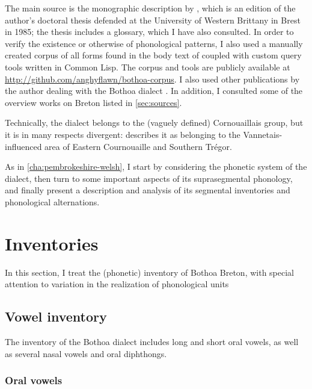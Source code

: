 The main source is the monographic description by \citet{humphreys95:_phonol_bothoa_saint_nicol_pelem}, which is an edition of the author's doctoral thesis defended at the University of Western Brittany in Brest in 1985;  the thesis includes a glossary, which I have also consulted. In order to verify the existence or otherwise of phonological patterns, I also used a manually created corpus of all forms found in the body text of \citet{humphreys95:_phonol_bothoa_saint_nicol_pelem} coupled with custom query tools written in Common Lisp. The corpus and tools are publicly available at \url{http://github.com/anghyflawn/bothoa-corpus}. I also used other publications by the author dealing with the Bothoa dialect \citep{humphreys,humphreys90:_tradit_moder_breton_welsh}. In addition, I consulted some of the overview works on Breton listed in \cref{sec:sources}.

Technically, the dialect belongs to the (vaguely defined) Cornouaillais group, but it is in many respects divergent: \citet{humphreys95:_phonol_bothoa_saint_nicol_pelem} describes it as belonging to the Vannetais-influenced area of Eastern Cournouaille and Southern Trégor.

As in \cref{cha:pembrokeshire-welsh}, I start by considering the phonetic system of the dialect, then turn to some important aspects of its suprasegmental phonology, and finally present a description and analysis of its segmental inventories and phonological alternations.

\section{Inventories}
\label{sec:inventories}

In this section, I treat the (phonetic) inventory of Bothoa Breton, with special attention to variation in the realization of phonological units

\subsection{Vowel inventory}
\label{sec:vowel-inventory}

The inventory of the Bothoa dialect includes long and short oral vowels, as well as several nasal vowels and oral diphthongs.

\subsubsection{Oral vowels}
\label{sec:oral-vowels}

